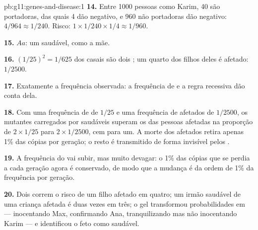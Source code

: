 \begin{solution}{pb:g11:genes-and-disease:1}
\textbf{14.} Entre 1000 pessoas como Karim, 40 são portadoras, das
quais 4 dão negativo, e 960 não portadoras dão negativo: $4/964 \approx
1/240$. Risco: $1 \times 1/240 \times 1/4 \approx 1/960$.

\textbf{15.} $Aa$: um  saudável, como a mãe.

\textbf{16.} $(1/25)^2 = 1/625$ dos casais são dois ; um
quarto dos filhos deles é afetado: $1/2500$.

\textbf{17.} Exatamente a frequência observada: a frequência de
 e a regra recessiva dão conta dela.

\textbf{18.} Com uma frequência de  de $1/25$ e uma
frequência de afetados de $1/2500$, os  mutantes carregados por
 saudáveis superam os das pessoas afetadas na proporção de
$2 \times 1/25$ para $2 \times
1/2500$, cem para um. A morte dos afetados retira apenas 1\% das cópias
por geração; o resto é transmitido de forma invisível pelos .

\textbf{19.} A frequência do  vai subir, mas muito devagar: o 1\%
das cópias que se perdia a cada geração agora é conservado, de modo que
a mudança é da ordem de 1\% da frequência por geração.

\textbf{20.} Dois  correm o risco de um filho afetado em
quatro; um irmão saudável de uma criança afetada é  duas vezes
em três; o gel transformou probabilidades em  --- inocentando
Max, confirmando Ana, tranquilizando mas não inocentando Karim --- e
identificou o feto como  saudável.
\end{solution}
